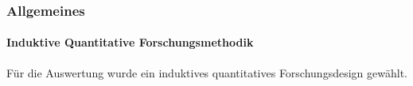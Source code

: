 \documentclass[a4paper,11pt]{article}%
\renewcommand{\\}{\vspace*{0.5\baselineskip} \newline}
\begin{document}
%
%			
%	

\subsubsection{Allgemeines}
			\paragraph{Induktive Quantitative Forschungsmethodik} Für die Auswertung wurde ein induktives quantitatives Forschungsdesign gewählt. 
\end{document}
